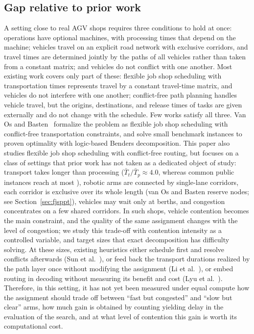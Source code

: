 \subsection{Gap relative to prior work}

A setting close to real AGV shops requires three conditions to hold at once: operations have optional machines, with processing times that depend on the machine; vehicles travel on an explicit road network with exclusive corridors, and travel times are determined jointly by the paths of all vehicles rather than taken from a constant matrix; and vehicles do not conflict with one another.
Most existing work covers only part of these: flexible job shop scheduling with transportation times represents travel by a constant travel-time matrix, and vehicles do not interfere with one another; conflict-free path planning handles vehicle travel, but the origins, destinations, and release times of tasks are given externally and do not change with the schedule.
Few works satisfy all three.
Van Os and Basten~\cite{vanos2026exact} formalize the problem as flexible job shop scheduling with conflict-free transportation constraints, and solve small benchmark instances to proven optimality with logic-based Benders decomposition.
This paper also studies flexible job shop scheduling with conflict-free routing, but focuses on a class of settings that prior work has not taken as a dedicated object of study: transport takes longer than processing ($\bar{T}_t/\bar{T}_p\approx4.0$, whereas common public instances reach at most \PubTtTpHi{}), robotic arms are connected by single-lane corridors, each corridor is exclusive over its whole length (van Os and Basten reserve nodes; see Section~\ref{sec:fjsppt}), vehicles may wait only at berths, and congestion concentrates on a few shared corridors.
In such shops, vehicle contention becomes the main constraint, and the quality of the same assignment changes with the level of congestion; we study this trade-off with contention intensity as a controlled variable, and target sizes that exact decomposition has difficulty solving.
At these sizes, existing heuristics either schedule first and resolve conflicts afterwards (Sun et al.~\cite{sun2023integrated}), or feed back the transport durations realized by the path layer once without modifying the assignment (Li et al.~\cite{li2026framework}), or embed routing in decoding without measuring its benefit and cost (Lyu et al.~\cite{lyu2019approach}).
Therefore, in this setting, it has not yet been measured under equal compute how the assignment should trade off between ``fast but congested'' and ``slow but clear'' arms, how much gain is obtained by counting yielding delay in the evaluation of the search, and at what level of contention this gain is worth its computational cost.

